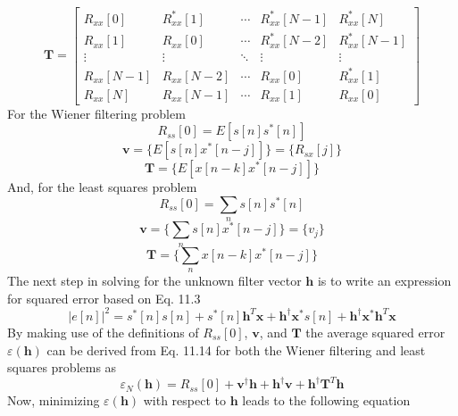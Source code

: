 \documentclass[11pt]{report}
\theoremstyle{example}
\begin{document}
\begin{equation}
	\mathbf{T}=
	\begin{bmatrix}
		R_{xx}[0] & R_{xx}^*[1] & \cdots&R_{xx}^*[N-1]&R_{xx}^*[N]\\
		R_{xx}[1] & R_{xx}[0] & \cdots & R_{xx}^*[N-2] & R_{xx}^*[N-1]\\
		\vdots & \vdots & \ddots & \vdots & \vdots\\
		R_{xx}[N-1] & R_{xx}[N-2] & \cdots & R_{xx}[0] & R_{xx}^*[1]\\
		R_{xx}[N] & R_{xx}[N-1] & \cdots & R_{xx}[1] & R_{xx}[0]
	\end{bmatrix}
\end{equation}
For the Wiener filtering problem
\begin{equation}
	R_{ss}[0]=E[s[n]s^*[n]]
\end{equation}
\begin{equation}
	\mathbf{v}=\{E[s[n]x^*[n-j]]\}=\{R_{sx}[j]\}
\end{equation}
\begin{equation}
	\mathbf{T}=\{E[x[n-k]x^*[n-j]]\}
\end{equation}
And, for the least squares problem
\begin{equation}
	R_{ss}[0]=\sum_n{s[n]s^*[n]}
\end{equation}
\begin{equation}
	\mathbf{v}=\{\sum_ns[n]x^*[n-j]\}=\{v_j\}
\end{equation}
\begin{equation}
	\mathbf{T}=\{\sum_nx[n-k]x^*[n-j]\}
\end{equation}
The next step in solving for the unknown filter vector $\mathbf{h}$ is to write an expression for squared error based on Eq. 11.3
\begin{equation}
	|e[n]|^2=s^*[n]s[n]+s^*[n]\mathbf{h}^T\mathbf{x}+\mathbf{h}^\dagger\mathbf{x}^*s[n]+\mathbf{h}^\dagger\mathbf{x}^*\mathbf{h}^T\mathbf{x}
\end{equation}
By making use of the definitions of $R_{ss}[0]$, $\mathbf{v}$, and $\mathbf{T}$ the average squared error  $\varepsilon(\mathbf{h})$ can be derived from Eq. 11.14 for both the Wiener filtering and least squares problems as
\begin{equation}
	\varepsilon_N(\mathbf{h})=R_{ss}[0]+\mathbf{v}^\dagger\mathbf{h}+\mathbf{h}^\dagger\mathbf{v}+\mathbf{h}^\dagger\mathbf{T}^T\mathbf{h}
\end{equation}
Now, minimizing $\varepsilon(\mathbf{h})$ with respect to $\mathbf{h}$ leads to the following equation
\end{document}
